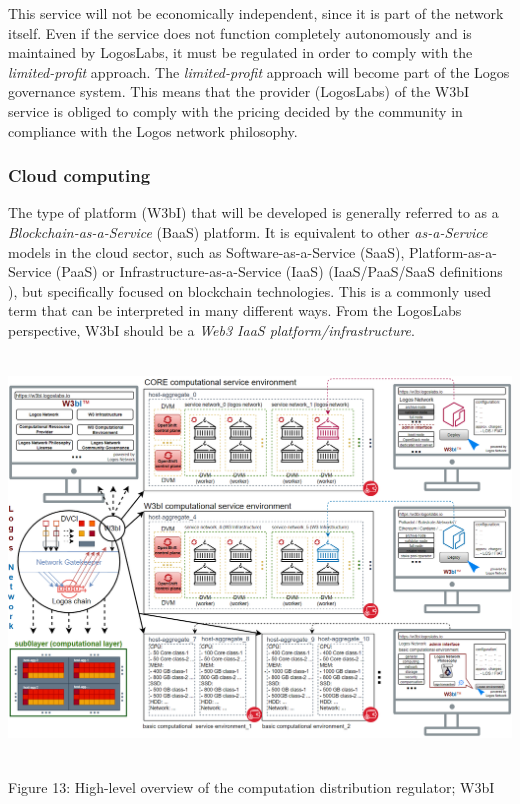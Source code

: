 \documentclass[]{article}
\begin{document}
This service will not be economically independent, since it is part of the network itself. 
Even if the service does not function completely autonomously and is maintained by LogosLabs, it must be regulated in order to comply with the \textit{limited-profit} approach.
The \textit{limited-profit} approach will become part of the Logos governance system.
This means that the provider (LogosLabs) of the W3bI service is obliged to comply with the pricing decided by the community in compliance with the Logos network philosophy.

\subsubsection{Cloud computing}
The type of platform (W3bI) that will be developed is generally referred to as a \textit{Blockchain-as-a-Service} (BaaS) \cite{baas} platform. 
It is equivalent to other \textit{as-a-Service} models in the cloud sector, such as Software-as-a-Service (SaaS), Platform-as-a-Service (PaaS) or Infrastructure-as-a-Service (IaaS) (IaaS/PaaS/SaaS definitions \cite{iaas-paas-saas}), but specifically focused on blockchain technologies.
This is a commonly used term that can be interpreted in many different ways.  
From the LogosLabs perspective, W3bI should be a \textit{Web3 IaaS platform/infrastructure}.

\begin{center}
	\includegraphics[height=10.7cm]{w3bi-overview}
\end{center}
\begin{center}
	Figure 13: High-level overview of the computation distribution regulator; W3bI
\end{center}
\end{document}
